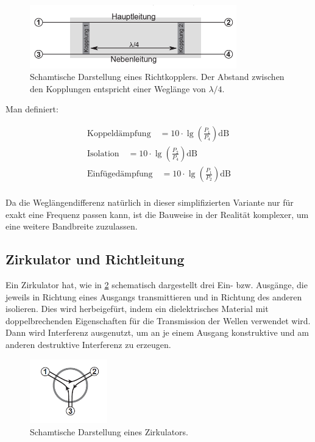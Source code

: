\documentclass[
	a4paper,
	12pt,
	pagesize,
	ngerman
]{scrartcl}
\begin{document}
	\begin{figure}[H]
		\includegraphics[width=0.8\textwidth]{img/richtkoppler.png}
		\centering
		\caption{
			Schamtische Darstellung eines Richtkopplers. Der Abstand zwischen den Kopplungen entspricht einer Weglänge von $\lambda/4$. \cite{Anleitung}
		}
		\label{fig_richtkoppler}
		\centering
	\end{figure}

	Man definiert:

	\begin{align}
		\text{Koppeldämpfung} \quad = 10 \cdot \lg{ \left( \frac{P_1}{P_4} \right) } \si{\deci \bel}
		\label{eq_koppeld}\\
		\text{Isolation} \quad = 10 \cdot \lg{ \left( \frac{P_2}{P_4} \right) } \si{\deci \bel}
		\label{eq_isolation}\\
		\text{Einfügedämpfung} \quad = 10 \cdot \lg{ \left( \frac{P_1}{P_2} \right) } \si{\deci \bel}
		\label{eq_einfueged}\\
	\end{align}

	Da die Weglängendifferenz natürlich in dieser simplifizierten Variante nur für exakt eine Frequenz passen kann, ist die Bauweise in der Realität komplexer, um eine weitere Bandbreite zuzulassen.

	\subsection{Zirkulator und Richtleitung}

	Ein Zirkulator hat, wie in \cref{fig_zirkulator} schematisch dargestellt drei Ein- bzw. Ausgänge, die jeweils in Richtung eines Ausgangs transmittieren und in Richtung des anderen isolieren.
	Dies wird herbeigefürt, indem ein dielektrisches Material mit doppelbrechenden Eigenschaften für die Transmission der Wellen verwendet wird.
	Dann wird Interferenz ausgenutzt, um an je einem Ausgang konstruktive und am anderen destruktive Interferenz zu erzeugen.

	\begin{figure}[H]
		\includegraphics[width=0.3\textwidth]{img/zirkulator.png}
		\centering
		\caption{
			Schamtische Darstellung eines Zirkulators. \cite{Anleitung}
		}
		\label{fig_zirkulator}
		\centering
	\end{figure}
\end{document}

